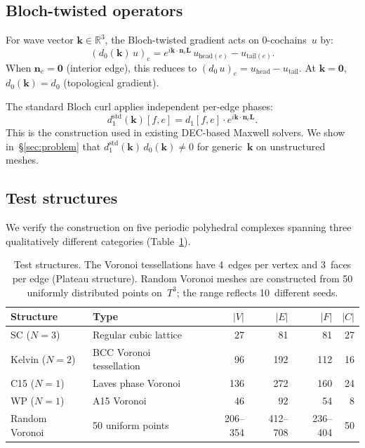 \documentclass[12pt]{article}
\theoremstyle{definition}
\theoremstyle{remark}
\newcommand{\RR}{\mathbb{R}}
\newcommand{\kk}{\mathbf{k}}
\newcommand{\LL}{\mathbf{L}}
\newcommand{\nn}{\mathbf{n}}
\begin{document}
\subsection{Bloch-twisted operators}

For wave vector $\kk \in \RR^3$, the Bloch-twisted gradient acts on
0-cochains~$u$ by:
\begin{equation}\label{eq:d0bloch}
  (d_0(\kk)\,u)_e = e^{i\kk\cdot\nn_e\LL}\,u_{\mathrm{head}(e)}
                   - u_{\mathrm{tail}(e)}.
\end{equation}
When $\nn_e = \mathbf{0}$ (interior edge), this reduces to
$(d_0\,u)_e = u_{\mathrm{head}} - u_{\mathrm{tail}}$.
At $\kk = \mathbf{0}$, $d_0(\kk) = d_0$ (topological gradient).

The standard Bloch curl applies independent per-edge phases:
\begin{equation}\label{eq:d1std}
  d_1^{\mathrm{std}}(\kk)[f,e] = d_1[f,e] \cdot e^{i\kk\cdot\nn_e\LL}.
\end{equation}
This is the construction used in existing DEC-based Maxwell solvers. We show
in~\S\ref{sec:problem} that
$d_1^{\mathrm{std}}(\kk)\,d_0(\kk) \neq 0$ for generic~$\kk$ on unstructured
meshes.

\subsection{Test structures}
\label{sec:structures}

We verify the construction on five periodic polyhedral complexes spanning
three qualitatively different categories (Table~\ref{tab:structures}).

\begin{table}[h]
\centering
\begin{tabular}{llrrrr}
\toprule
Structure & Type & $|V|$ & $|E|$ & $|F|$ & $|C|$ \\
\midrule
SC ($N{=}3$)       & Regular cubic lattice      & 27  & 81  & 81  & 27 \\
Kelvin ($N{=}2$)   & BCC Voronoi tessellation   & 96  & 192 & 112 & 16 \\
C15 ($N{=}1$)      & Laves phase Voronoi        & 136 & 272 & 160 & 24 \\
WP ($N{=}1$)       & A15 Voronoi                & 46  & 92  & 54  & 8  \\
Random Voronoi     & 50 uniform points          & 206--354 & 412--708 & 236--404 & 50 \\
\bottomrule
\end{tabular}
\caption{Test structures. The Voronoi tessellations have 4~edges per vertex
and 3~faces per edge (Plateau structure). Random Voronoi meshes are constructed
from 50 uniformly distributed points on~$T^3$; the range reflects 10~different
seeds.}
\label{tab:structures}
\end{table}
\end{document}
